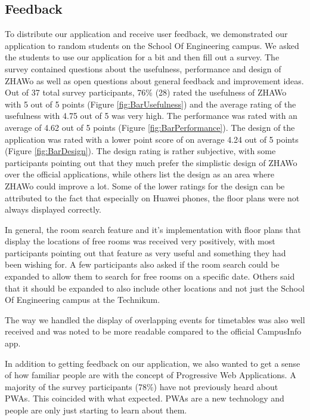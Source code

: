 \begin{markdown}
\section{Feedback} \label{results}

To distribute our application and receive user feedback, we demonstrated our application to random students on the School Of Engineering campus. We asked the students to use our application for a bit and then fill out a survey. The survey contained questions about the usefulness, performance and design of ZHAWo as well as open questions about general feedback and improvement ideas. Out of 37 total survey participants, 76\% (28) rated the usefulness of ZHAWo with 5 out of 5 points (Figure \ref{fig:BarUsefulness}) and the average rating of the usefulness with 4.75 out of 5 was very high. The performance was rated with an average of 4.62 out of 5 points (Figure \ref{fig:BarPerformance}). The design of the application was rated with a lower point score of on average 4.24 out of 5 points (Figure \ref{fig:BarDesign}). The design rating is rather subjective, with some participants pointing out that they much prefer the simplistic design of ZHAWo over the official applications, while others list the design as an area where ZHAWo could improve a lot. Some of the lower ratings for the design can be attributed to the fact that especially on Huawei phones, the floor plans were not always displayed correctly.

In general, the room search feature and it's implementation with floor plans that display the locations of free rooms was received very positively, with most participants pointing out that feature as very useful and something they had been wishing for. A few participants also asked if the room search could be expanded to allow them to search for free rooms on a specific date. Others said that it should be expanded to also include other locations and not just the School Of Engineering campus at the Technikum.

The way we handled the display of overlapping events for timetables was also well received and was noted to be more readable compared to the official CampusInfo app.

In addition to getting feedback on our application, we also wanted to get a sense of how familiar people are with the concept of Progressive Web Applications. A majority of the survey participants (78\%) have not previously heard about PWAs. This coincided with what expected. PWAs are a new technology and people are only just starting to learn about them. 


\end{markdown}
